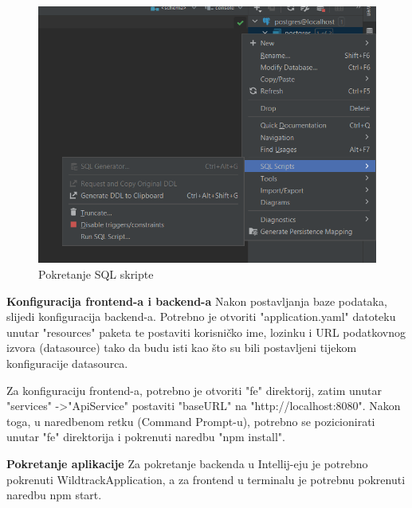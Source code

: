 			\begin{figure}[H]
				\includegraphics[scale=0.3]{slike/runSqlScript.png} 
				\centering
				\caption{Pokretanje SQL skripte}
				\label{fig:promjene}
			\end{figure}
			
			\textbf{Konfiguracija frontend-a i backend-a}
			Nakon postavljanja baze podataka, slijedi konfiguracija backend-a. Potrebno je otvoriti "application.yaml" datoteku unutar "resources" paketa te postaviti korisničko ime, lozinku i URL podatkovnog izvora (datasource) tako da budu isti kao što su bili postavljeni tijekom konfiguracije datasourca.
			
			Za konfiguraciju frontend-a, potrebno je otvoriti "fe" direktorij, zatim unutar "services" -\textgreater "ApiService" postaviti "baseURL" na "http://localhost:8080". Nakon toga, u naredbenom retku (Command Prompt-u), potrebno se pozicionirati unutar "fe" direktorija i pokrenuti naredbu "npm install".
			
			\textbf{Pokretanje aplikacije}
			Za pokretanje backenda u Intellij-eju je potrebno pokrenuti WildtrackApplication, a za frontend u terminalu je potrebnu pokrenuti naredbu npm start.
			
			\eject 